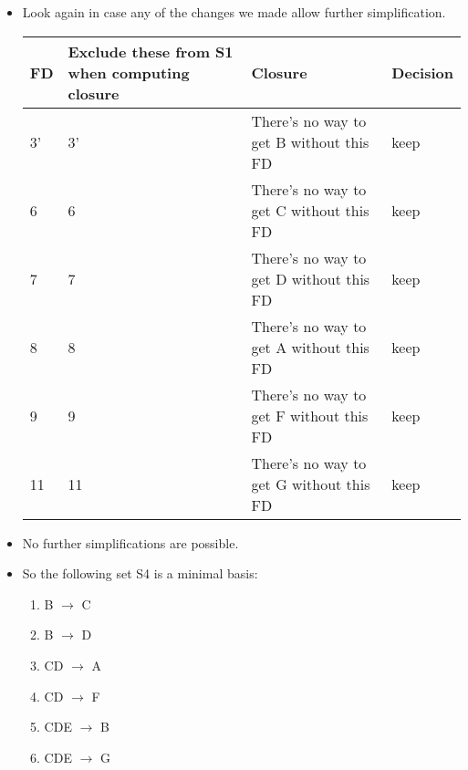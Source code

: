 \documentclass{article}
\begin{document}
\begin{enumerate}
\begin{enumerate} [leftmargin=0pt, itemindent=*]
\begin{itemize}
\item %
Look again in case any of the changes we made allow further simplification.
\begin{table}[h!]
\centering
\begin{tabular}{ p{0.5cm} | p{4cm} | p{8cm} | p{2cm} } 
 FD & Exclude these from S1 when computing closure & Closure & Decision \\ [0.5ex] 
 \hline
 3' & 3' & There's no way to get B without this FD & keep \\
  \hline
 6 & 6 & There's no way to get C without this FD & keep \\
  \hline
 7 & 7 & There's no way to get D without this FD & keep \\
  \hline
 8 & 8 & There's no way to get A without this FD & keep \\
  \hline
 9 & 9 & There's no way to get F without this FD& keep \\
  \hline
 11 & 11 & There's no way to get G without this FD & keep \\
\end{tabular}
\end{table}

\item %
No further simplifications are possible.

\item %
So the following set S4 is a minimal basis:
\begin{enumerate} 
\item B $\rightarrow$ C
\item B $\rightarrow$ D
\item CD $\rightarrow$ A
\item CD $\rightarrow$ F
\item CDE $\rightarrow$ B
\item CDE $\rightarrow$ G
\end{enumerate}

\end{itemize}

\end{enumerate}

\end{enumerate}
\end{document}

